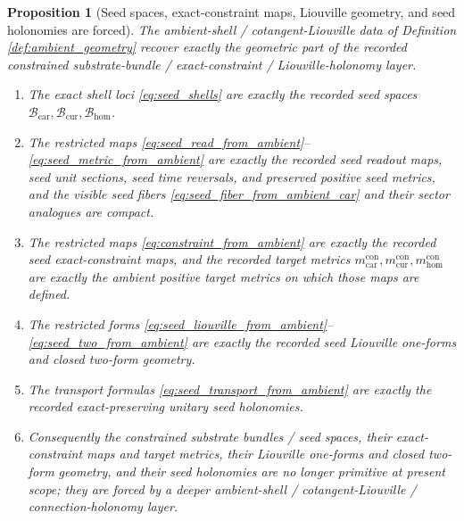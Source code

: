 \documentclass[11pt]{article}
\newcommand{\TensorSeedSpace}{\mathcal B_{\mathrm{car}}}
\newcommand{\CurSeedSpace}{\mathcal B_{\mathrm{cur}}}
\newcommand{\HomSeedSpace}{\mathcal B_{\mathrm{hom}}}
\newcommand{\TensorConstraintMetric}{m_{\mathrm{car}}^{\mathrm{con}}}
\newcommand{\CurConstraintMetric}{m_{\mathrm{cur}}^{\mathrm{con}}}
\newcommand{\HomConstraintMetric}{m_{\mathrm{hom}}^{\mathrm{con}}}
\newtheorem{proposition}{Proposition}
\begin{document}
\begin{proposition}[Seed spaces, exact-constraint maps, Liouville geometry, and seed holonomies are forced]
\label{prop:seed_geometry_forced}
The ambient-shell / cotangent-Liouville data of Definition \ref{def:ambient_geometry} recover exactly the geometric part of the recorded constrained substrate-bundle / exact-constraint / Liouville-holonomy layer.
\begin{enumerate}
    \item The exact shell loci \eqref{eq:seed_shells} are exactly the recorded seed spaces \(\TensorSeedSpace,\CurSeedSpace,\HomSeedSpace\).
    \item The restricted maps \eqref{eq:seed_read_from_ambient}--\eqref{eq:seed_metric_from_ambient} are exactly the recorded seed readout maps, seed unit sections, seed time reversals, and preserved positive seed metrics, and the visible seed fibers \eqref{eq:seed_fiber_from_ambient_car} and their sector analogues are compact.
    \item The restricted maps \eqref{eq:constraint_from_ambient} are exactly the recorded seed exact-constraint maps, and the recorded target metrics \(\TensorConstraintMetric,\CurConstraintMetric,\HomConstraintMetric\) are exactly the ambient positive target metrics on which those maps are defined.
    \item The restricted forms \eqref{eq:seed_liouville_from_ambient}--\eqref{eq:seed_two_from_ambient} are exactly the recorded seed Liouville one-forms and closed two-form geometry.
    \item The transport formulas \eqref{eq:seed_transport_from_ambient} are exactly the recorded exact-preserving unitary seed holonomies.
    \item Consequently the constrained substrate bundles / seed spaces, their exact-constraint maps and target metrics, their Liouville one-forms and closed two-form geometry, and their seed holonomies are no longer primitive at present scope; they are forced by a deeper ambient-shell / cotangent-Liouville / connection-holonomy layer.
\end{enumerate}
\end{proposition}
\end{document}
